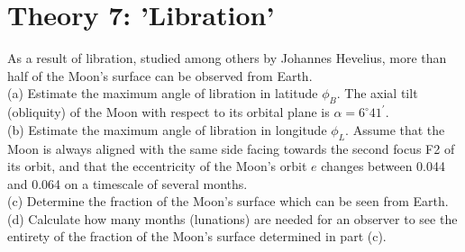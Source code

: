 \documentclass[10pt]{article}
\begin{document}
\section*{Theory 7: 'Libration'}
As a result of libration, studied among others by Johannes Hevelius, more than half of the Moon's surface can be observed from Earth.\\
(a) Estimate the maximum angle of libration in latitude $\phi_{B}$. The axial tilt (obliquity) of the Moon with respect to its orbital plane is $\alpha=6^{\circ} 41^{\prime}$.\\
(b) Estimate the maximum angle of libration in longitude $\phi_{L}$. Assume that the Moon is always aligned with the same side facing towards the second focus F2 of its orbit, and that the eccentricity of the Moon's orbit $e$ changes between 0.044 and 0.064 on a timescale of several months.\\
(c) Determine the fraction of the Moon's surface which can be seen from Earth.\\
(d) Calculate how many months (lunations) are needed for an observer to see the entirety of the fraction of the Moon's surface determined in part (c).\\
\end{document}
